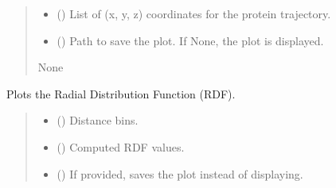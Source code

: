 \documentclass[letterpaper,10pt,english]{sphinxmanual}
\begin{document}
\begin{fulllineitems}
\begin{fulllineitems}
\begin{quote}
\begin{description}
\begin{itemize}
\item {} 
\sphinxAtStartPar
{} () \textendash{} List of (x, y, z) coordinates for the protein trajectory.

\item {} 
\sphinxAtStartPar
{} (\sphinxstyleliteralemphasis{\sphinxupquote{, }}) \textendash{} Path to save the plot. If None, the plot is displayed.

\end{itemize}

\sphinxAtStartPar
None

\end{description}\end{quote}

\end{fulllineitems}


\begin{fulllineitems}
\label{\detokenize{src:src.Analysis_Class.Analysis.plot_rdf}}
\pysigstartsignatures
{}
\pysigstopsignatures
\sphinxAtStartPar
Plots the Radial Distribution Function (RDF).
\begin{quote}\begin{description}
\begin{itemize}
\item {} 
\sphinxAtStartPar
{} () \textendash{} Distance bins.

\item {} 
\sphinxAtStartPar
{} () \textendash{} Computed RDF values.

\item {} 
\sphinxAtStartPar
{} (\sphinxstyleliteralemphasis{\sphinxupquote{, }}) \textendash{} If provided, saves the plot instead of displaying.


\end{itemize}
\end{description}
\end{quote}
\end{fulllineitems}
\end{fulllineitems}
\end{document}
